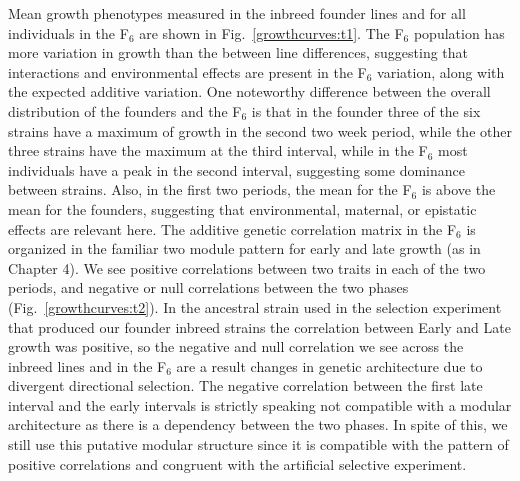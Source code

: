 \begin{refsection}
Mean growth phenotypes measured in the inbreed founder lines and for all
individuals in the F$_{\text{6}}$ are shown in Fig.~\ref{growthcurves:t1}. The
F$_{\text{6}}$ population has more variation in growth than the between line
differences, suggesting that interactions and environmental effects are
present in the F$_{\text{6}}$ variation, along with the expected additive
variation. One noteworthy difference between the overall distribution of the
founders and the F$_{\text{6}}$ is that in the founder three of the six
strains have a maximum of growth in the second two week period, while the
other three strains have the maximum at the third interval, while in the
F$_{\text{6}}$ most individuals have a peak in the second interval, suggesting
some dominance between strains. Also, in the first two periods, the mean for
the F$_{\text{6}}$ is above the mean for the founders, suggesting that
environmental, maternal, or epistatic effects are relevant here. The additive
genetic correlation matrix in the F$_{\text{6}}$ is organized in the familiar
two module pattern for early and late growth (as in Chapter 4). We see
positive correlations between two traits in each of the two periods, and
negative or null correlations between the two phases
(Fig.~\ref{growthcurves:t2}). In the ancestral strain used in the selection
experiment that produced our founder inbreed strains the correlation between
Early and Late growth was positive, so the negative and null correlation we
see across the inbreed lines and in the F$_{\text{6}}$ are a result changes in
genetic architecture due to divergent directional
selection. The negative correlation between the
first late interval and the early intervals is strictly speaking not
compatible with a modular architecture as there is a dependency between the
two phases. In spite of this, we still use this putative modular structure
since it is compatible with the pattern of positive correlations and congruent
with the artificial selective experiment.


\end{refsection}
